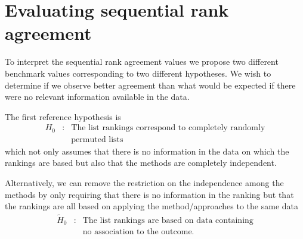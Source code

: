 \documentclass[12pt,a4paper]{article}
\newcommand{\nn}{\nonumber}
\theoremstyle{plain}
\begin{document}





\section{Evaluating sequential rank agreement}
To interpret the sequential rank agreement values we propose two
different benchmark values corresponding to two different
hypotheses. We wish to determine if we observe better agreement than
what would be expected if there were no relevant information available
in the data.

The first reference hypothesis is
\begin{eqnarray}
H_0  & : &  \text{The list rankings correspond to completely randomly}\label{eq:permutationHypothesis}\\
       &  & \text{permuted lists}\nn
\end{eqnarray}
which not only assumes that there is no information in the data on
which the rankings are based but also that the methods are completely
independent.

Alternatively, we can remove the restriction on the independence among
the methods by only requiring that there is no information in the
ranking but that the rankings are all based on applying the
method/approaches to the same data
\begin{eqnarray*}
\widetilde H_0 & :&  \text{The list rankings are based on data containing}\\
& &   \text{no association to the outcome.}
\end{eqnarray*}
\end{document}
